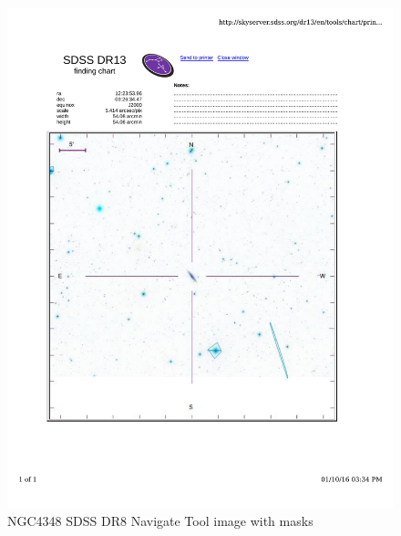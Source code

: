 \documentclass[10pt,letterpaper]{article}
\begin{document}
\begin{figure}[h!]
\centering
\includegraphics[scale=0.7]{figures/NGC4348.pdf}
\caption{NGC4348 SDSS DR8 Navigate Tool image with masks}
\end{figure}
\end{document}
